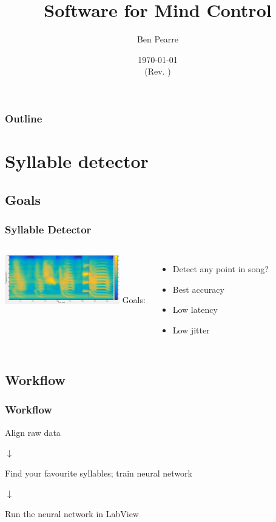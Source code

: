 \documentclass{beamer}
\title{Software for Mind Control}
\author{Ben Pearre}
\date{\today\\{\small (Rev. \svnrev)}}
\begin{document}
\begin{frame}
  \titlepage
\end{frame}

\begin{frame}
  \frametitle{Outline}
  \tableofcontents
\end{frame}



\section{Syllable detector}
\subsection{Goals}

\begin{frame}
  \frametitle{Syllable Detector}
  \begin{columns}
    \column{5cm}
    \includegraphics[width=5cm]{song-spectrogram-with-alignment-1}
    \column{50mm}
    Goals:
    \begin{itemize}
    \item Detect any point in song?
    \item Best accuracy
    \item Low latency
    \item Low jitter
    \end{itemize}
  \end{columns}
\end{frame}

\subsection{Workflow}

\begin{frame}
  \frametitle{Workflow}
  \begin{tcolorbox}[colback=blue!5,colframe=blue!40!black,title={\tt zftftb\_song\_clust.m} --- Jeff]
    Align raw data
  \end{tcolorbox}
  \begin{center}
    $\downarrow$
  \end{center}
  \begin{tcolorbox}[colback=blue!5,colframe=blue!40!black,title={\tt learn\_detector.m} --- Ben]
    Find your favourite syllables; train neural network
  \end{tcolorbox}
  \begin{center}
    $\downarrow$
  \end{center}
  \begin{tcolorbox}[colback=blue!5,colframe=blue!40!black,title={\tt nnfft.vi} --- Ben]
    Run the neural network in LabView
  \end{tcolorbox}
\end{frame}
  
\end{document}
